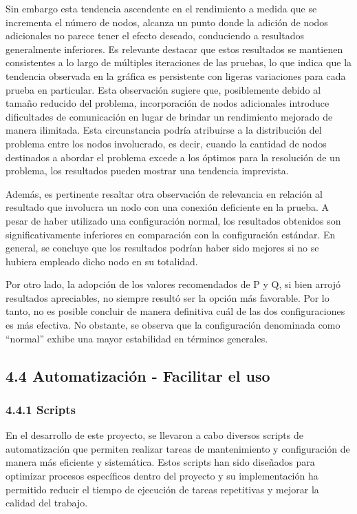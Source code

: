 \begin{spacing}{1.5}
  Sin embargo esta tendencia ascendente en el rendimiento a medida que se incrementa el número de nodos, alcanza un punto donde la adición de nodos adicionales no parece tener el efecto deseado, conduciendo a resultados generalmente inferiores. Es relevante destacar que estos resultados se mantienen consistentes a lo largo de múltiples iteraciones de las pruebas, lo que indica que la tendencia observada en la gráfica es persistente con ligeras variaciones para cada prueba en particular. Esta observación sugiere que, posiblemente debido al tamaño reducido del problema, incorporación de nodos adicionales introduce dificultades de comunicación en lugar de brindar un rendimiento mejorado de manera ilimitada. Esta circunstancia podría atribuirse a la distribución del problema entre los nodos involucrado, es decir, cuando la cantidad de nodos destinados a abordar el problema excede a los óptimos para la resolución de un problema, los resultados pueden mostrar una tendencia imprevista.

  Además, es pertinente resaltar otra observación de relevancia en relación al resultado que involucra un nodo con una conexión deficiente en la prueba. A pesar de haber utilizado una configuración normal, los resultados obtenidos son significativamente inferiores en comparación con la configuración estándar. En general, se concluye que los resultados podrían haber sido mejores si no se hubiera empleado dicho nodo en su totalidad.

  Por otro lado, la adopción de los valores recomendados de P y Q, si bien arrojó resultados apreciables, no siempre resultó ser la opción más favorable. Por lo tanto, no es posible concluir de manera definitiva cuál de las dos configuraciones es más efectiva. No obstante, se observa que la configuración denominada como ``normal'' exhibe una mayor estabilidad en términos generales.

  \subsection{4.4 Automatización - Facilitar el uso}   \label{chap:4.4}

  \subsubsection{4.4.1 Scripts}

  En el desarrollo de este proyecto, se llevaron a cabo diversos scripts de
  automatización que permiten realizar tareas de mantenimiento y configuración
  de
  manera más eficiente y sistemática. Estos scripts han sido diseñados para
  optimizar procesos específicos dentro del proyecto y su implementación ha
  permitido reducir el tiempo de ejecución de tareas repetitivas y mejorar la
  calidad del trabajo.


\end{spacing}
